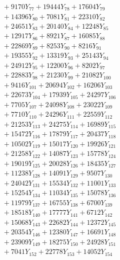 \documentclass[a4paper,10pt]{article}
\begin{document}
{\begin{align}
&\;  + 9170 Y_{77} + 19444 Y_{78} + 17604 Y_{79} \\[0.3ex]
&\;  + 14396 Y_{80} + 7081 Y_{81} + 22310 Y_{82} \\[0.3ex]
&\;  + 24651 Y_{83} + 20140 Y_{84} + 12248 Y_{85} \\[0.3ex]
&\;  + 12917 Y_{86} + 8921 Y_{87} + 16085 Y_{88} \\[0.5ex]\allowbreak
&\;  + 22869 Y_{89} + 8253 Y_{90} + 8216 Y_{91} \\[0.3ex]
&\;  + 19355 Y_{92} + 13319 Y_{93} + 25143 Y_{94} \\[0.3ex]
&\;  + 24912 Y_{95} + 12200 Y_{96} + 8202 Y_{97} \\[0.3ex]
&\;  + 22883 Y_{98} + 21230 Y_{99} + 21082 Y_{100} \\[0.3ex]
&\;  + 9416 Y_{101} + 20694 Y_{102} + 16206 Y_{103} \\[0.3ex]
&\;  + 22673 Y_{104} + 17939 Y_{105} + 24297 Y_{106} \\[0.3ex]
&\;  + 7705 Y_{107} + 24098 Y_{108} + 23022 Y_{109} \\[0.3ex]
&\;  + 7710 Y_{110} + 24296 Y_{111} + 22559 Y_{112} \\[0.3ex]
&\;  + 21253 Y_{113} + 24275 Y_{114} + 16989 Y_{115} \\[0.3ex]
&\;  + 15472 Y_{116} + 17879 Y_{117} + 20437 Y_{118} \\[0.5ex]\allowbreak
&\;  + 10502 Y_{119} + 15017 Y_{120} + 19926 Y_{121} \\[0.3ex]
&\;  + 21258 Y_{122} + 14087 Y_{123} + 15778 Y_{124} \\[0.3ex]
&\;  + 19019 Y_{125} + 20028 Y_{126} + 18435 Y_{127} \\[0.3ex]
&\;  + 11238 Y_{128} + 14091 Y_{129} + 9507 Y_{130} \\[0.3ex]
&\;  + 24042 Y_{131} + 15534 Y_{132} + 11001 Y_{133} \\[0.3ex]
&\;  + 15254 Y_{134} + 11034 Y_{135} + 15078 Y_{136} \\[0.3ex]
&\;  + 11979 Y_{137} + 16755 Y_{138} + 6700 Y_{139} \\[0.3ex]
&\;  + 18518 Y_{140} + 17777 Y_{141} + 6712 Y_{142} \\[0.3ex]
&\;  + 15068 Y_{143} + 22682 Y_{144} + 12372 Y_{145} \\[0.3ex]
&\;  + 20354 Y_{146} + 12380 Y_{147} + 16691 Y_{148} \\[0.5ex]\allowbreak
&\;  + 23909 Y_{149} + 18275 Y_{150} + 24928 Y_{151} \\[0.3ex]
&\;  + 7041 Y_{152} + 22778 Y_{153} + 14052 Y_{154} \\[0.3ex]

\end{align}}
\end{document}
